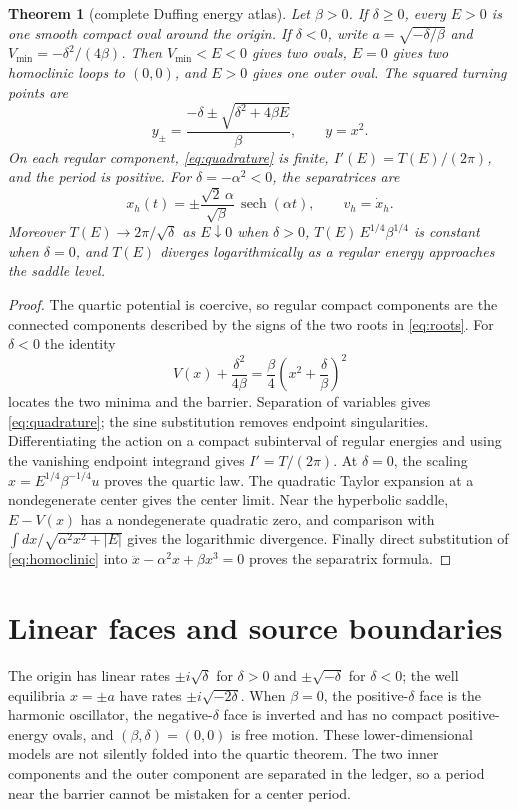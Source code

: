 \documentclass[11pt]{article}
\newtheorem{theorem}{Theorem}
\begin{document}
\begin{theorem}[complete Duffing energy atlas]\label{thm:atlas}
Let $\beta>0$.  If $\delta\geq0$, every $E>0$ is one smooth compact oval
around the origin.  If $\delta<0$, write $a=\sqrt{-\delta/\beta}$ and
$V_{\min}=-\delta^2/(4\beta)$.  Then $V_{\min}<E<0$ gives two ovals,
$E=0$ gives two homoclinic loops to $(0,0)$, and $E>0$ gives one outer oval.
The squared turning points are
\begin{equation}
 y_\pm=\frac{-\delta\pm\sqrt{\delta^2+4\beta E}}{\beta},\qquad y=x^2 .
 \label{eq:roots}
\end{equation}
On each regular component, \eqref{eq:quadrature} is finite, $I'(E)=T(E)/(2\pi)$,
and the period is positive.  For $\delta=-\alpha^2<0$, the separatrices are
\begin{equation}
 x_h(t)=\pm\frac{\sqrt{2}\,\alpha}{\sqrt\beta}\,\operatorname{sech}(\alpha t),
 \qquad v_h=\dot x_h .
 \label{eq:homoclinic}
\end{equation}
Moreover $T(E)\to2\pi/\sqrt\delta$ as $E\downarrow0$ when $\delta>0$,
$T(E)\,E^{1/4}\beta^{1/4}$ is constant when $\delta=0$, and $T(E)$
diverges logarithmically as a regular energy approaches the saddle level.
\end{theorem}

\begin{proof}
The quartic potential is coercive, so regular compact components are the
connected components described by the signs of the two roots in
\eqref{eq:roots}.  For $\delta<0$ the identity
\[
 V(x)+\frac{\delta^2}{4\beta}=\frac\beta4\left(x^2+\frac\delta\beta\right)^2
\]
locates the two minima and the barrier.  Separation of variables gives
\eqref{eq:quadrature}; the sine substitution removes endpoint singularities.
Differentiating the action on a compact subinterval of regular energies and
using the vanishing endpoint integrand gives $I'=T/(2\pi)$.  At $\delta=0$,
the scaling $x=E^{1/4}\beta^{-1/4}u$ proves the quartic law.  The quadratic
Taylor expansion at a nondegenerate center gives the center limit.  Near the
hyperbolic saddle, $E-V(x)$ has a nondegenerate quadratic zero, and comparison
with $\int dx/\sqrt{\alpha^2x^2+|E|}$ gives the logarithmic divergence.
Finally direct substitution of \eqref{eq:homoclinic} into
$\ddot x-\alpha^2x+\beta x^3=0$ proves the separatrix formula.
\end{proof}

\section{Linear faces and source boundaries}
The origin has linear rates $\pm i\sqrt\delta$ for $\delta>0$ and
$\pm\sqrt{-\delta}$ for $\delta<0$; the well equilibria $x=\pm a$ have
rates $\pm i\sqrt{-2\delta}$.  When $\beta=0$, the positive-$\delta$ face is
the harmonic oscillator, the negative-$\delta$ face is inverted and has no
compact positive-energy ovals, and $(\beta,\delta)=(0,0)$ is free motion.
These lower-dimensional models are not silently folded into the quartic
theorem.  The two inner components and the outer component are separated in
the ledger, so a period near the barrier cannot be mistaken for a center
period.
\end{document}
